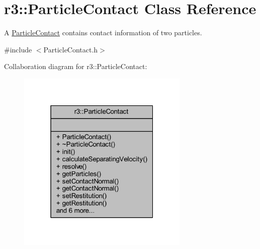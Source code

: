 \hypertarget{classr3_1_1_particle_contact}{}\section{r3\+:\+:Particle\+Contact Class Reference}
\label{classr3_1_1_particle_contact}


A \mbox{\hyperlink{classr3_1_1_particle_contact}{Particle\+Contact}} contains contact information of two particles.  




{\ttfamily \#include $<$Particle\+Contact.\+h$>$}



Collaboration diagram for r3\+:\+:Particle\+Contact\+:\nopagebreak
\begin{figure}[H]
\begin{center}
\leavevmode
\includegraphics[width=232pt]{classr3_1_1_particle_contact__coll__graph}
\end{center}
\end{figure}
